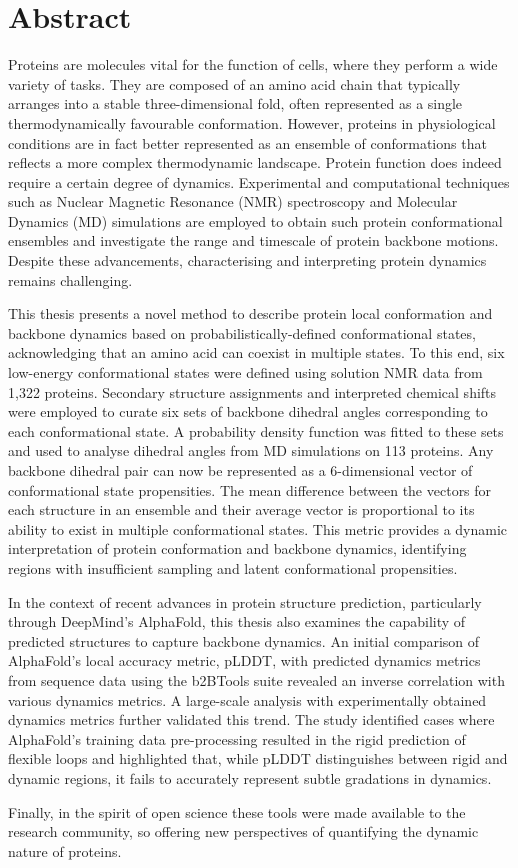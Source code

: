 \chapter*{Abstract}

Proteins are molecules vital for the function of cells, where they perform a wide variety of tasks. They are composed of an amino acid chain that typically arranges into a stable three-dimensional fold, often represented as a single thermodynamically favourable conformation. However, proteins in physiological conditions are in fact better represented as an ensemble of conformations that reflects a more complex thermodynamic landscape. Protein function does indeed require a certain degree of dynamics. Experimental and computational techniques such as Nuclear Magnetic Resonance (NMR) spectroscopy and Molecular Dynamics (MD) simulations are employed to obtain such protein conformational ensembles and investigate the range and timescale of protein backbone motions. Despite these advancements, characterising and interpreting protein dynamics remains challenging.

This thesis presents a novel method to describe protein local conformation and backbone dynamics based on probabilistically-defined conformational states, acknowledging that an amino acid can coexist in multiple states. To this end, six low-energy conformational states were defined using solution NMR data from 1,322 proteins. Secondary structure assignments and interpreted chemical shifts were employed to curate six sets of backbone dihedral angles corresponding to each conformational state. A probability density function was fitted to these sets and used to analyse dihedral angles from MD simulations on 113 proteins. Any backbone dihedral pair can now be represented as a 6-dimensional vector of conformational state propensities. The mean difference between the vectors for each structure in an ensemble and their average vector is proportional to its ability to exist in multiple conformational states. This metric provides a dynamic interpretation of protein conformation and backbone dynamics, identifying regions with insufficient sampling and latent conformational propensities.

In the context of recent advances in protein structure prediction, particularly through DeepMind’s AlphaFold, this thesis also examines the capability of predicted structures to capture backbone dynamics. An initial comparison of AlphaFold's local accuracy metric, pLDDT, with predicted dynamics metrics from sequence data using the b2BTools suite revealed an inverse correlation with various dynamics metrics. A large-scale analysis with experimentally obtained dynamics metrics further validated this trend. The study identified cases where AlphaFold’s training data pre-processing resulted in the rigid prediction of flexible loops and highlighted that, while pLDDT distinguishes between rigid and dynamic regions, it fails to accurately represent subtle gradations in dynamics.

Finally, in the spirit of open science these tools were made available to the research community, so offering new perspectives of quantifying the dynamic nature of proteins.
